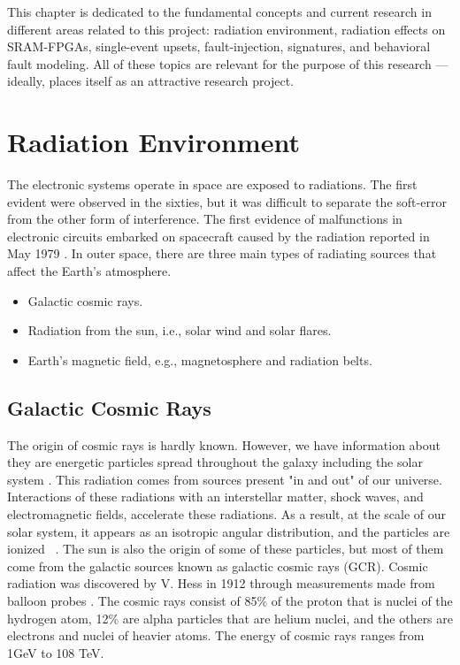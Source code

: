 
This chapter is dedicated to the fundamental concepts and current research in different areas related to this project: radiation environment, radiation effects on SRAM-FPGAs, single-event upsets, fault-injection, signatures,  and behavioral fault modeling. All of these topics are relevant for the purpose of this research --- ideally, places itself as an attractive research project.


\section{Radiation Environment}
The electronic systems operate in space are exposed to radiations. The first evident were observed in the sixties, but it was difficult to separate the soft-error from the other form of interference. The first evidence of malfunctions in electronic circuits embarked on spacecraft caused by the radiation reported in May 1979 \citep{may1979alpha}. In outer space, there are three main types of radiating sources that affect the Earth's atmosphere.
\begin{itemize}
\item Galactic cosmic rays.
\item Radiation from the sun, i.e., solar wind and solar flares.
\item Earth's magnetic field, e.g., magnetosphere and radiation belts.
\end{itemize}
\subsection{Galactic Cosmic Rays} 
The origin of cosmic rays is hardly known. However, we have information about they are energetic particles spread throughout the galaxy including the solar system \citep{SWE2016}. This radiation comes from sources present "in and out" of our
universe. Interactions of these radiations with an interstellar matter, shock waves, and electromagnetic fields, accelerate these radiations. As a result, at the scale of our
solar system, it appears as an isotropic angular distribution, and the particles are ionized~ \citep{SWE2016}. The sun is also the origin of some of these particles, but most of them come from the galactic sources known as galactic cosmic rays (GCR).
Cosmic radiation was discovered by V. Hess in 1912 through measurements made from balloon probes \citep{cronin1999cosmic}. The cosmic rays consist of 85\% of the proton that is nuclei of the hydrogen atom, 12\% are alpha particles that are helium nuclei, and the others are electrons and nuclei of heavier atoms. The energy of cosmic rays ranges from 1GeV to 108 TeV. 
